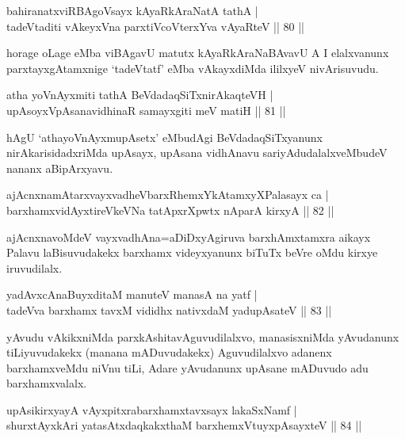 \begin{shl}
bahiranatxviRBAgoV\s sayx kAyaRkAraNatA tathA |\\
tadeVtaditi vAkeyxVna parxtiVcoV\s terxYva vAyaRteV \hfill || 80 ||
\end{shl}

\begin{artha}
horage oLage eMba viBAgavU matutx kAyaRkAraNaBAvavU A I elalxvanunx parxtayxgAtamxnige `tadeVtatf' eMba vAkayxdiMda ililxyeV nivArisuvudu.
\end{artha}

\begin{shl}
atha yoV\s nAyxmiti tathA BeVdadaqSiTxnirAkaqteVH |\\
upAsoyxVpAsanavidhinaR samayxgiti meV matiH \hfill || 81 ||
\end{shl}

\begin{artha}
hAgU `athayoV\s nAyxmupAsetx' eMbudAgi BeVdadaqSiTxyanunx nirAkarisidadxriMda upAsayx, upAsana vidhAnavu sariyAdudalalxveMbudeV nananx aBipArxyavu.
\end{artha}

\begin{shl}
ajAcnxnamAtarxvayxvadheVbarxRhemxYkAtamxyXPalasayx ca |\\
barxhamxvidAyxtireVkeVNa tatApxrXpwtx nAparA kirxyA \hfill || 82 ||
\end{shl}

\begin{artha}
ajAcnxnavoMdeV vayxvadhAna=aDiDxyAgiruva barxhAmxtamxra aikayx Palavu laBisuvudakekx barxhamx videyxyanunx biTuTx beVre oMdu kirxye iruvudilalx.
\end{artha}

  
  \begin{shl}
yadAvxcA\s naBuyxditaM manuteV manasA na yatf |\\
tadeVva barxhamx tavxM vididhx  nativxdaM yadupAsateV \hfill || 83 ||
\end{shl}

\begin{artha}
yAvudu vAkikxniMda parxkAshitavAguvudilalxvo, manasisxniMda yAvudanunx tiLiyuvudakekx (manana mADuvudakekx) Aguvudilalxvo adanenx barxhamxveMdu niVnu tiLi, Adare yAvudanunx upAsane mADuvudo adu barxhamxvalalx.
\end{artha}

\begin{shl}
upAsikirxyayA vAyxpitxrabarxhamxtavxsayx lakaSxNamf |\\
shurxtAyx\s kAri yatasAtxdaqkakxthaM barxhemxVtuyxpAsayxteV \hfill || 84 ||
\end{shl}

